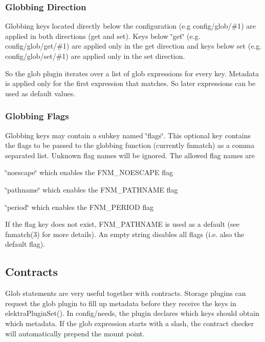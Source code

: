 \subsubsection*{Globbing Direction}

Globbing keys located directly below the configuration (e.\+g {\ttfamily config/glob/\#1}) are applied in both directions (get and set). Keys below \char`\"{}get\char`\"{} (e.\+g. {\ttfamily config/glob/get/\#1}) are applied only in the get direction and keys below set (e.\+g. {\ttfamily config/glob/set/\#1}) are applied only in the set direction.

So the glob plugin iterates over a list of glob expressions for every key. Metadata is applied only for the first expression that matches. So later expressions can be used as default values.

\subsubsection*{Globbing Flags}

Globbing keys may contain a subkey named \char`\"{}flags\char`\"{}. This optional key contains the flags to be passed to the globbing function (currently fnmatch) as a comma separated list. Unknown flag names will be ignored. The allowed flag names are


\begin{DoxyItemize}
\item \char`\"{}noescape\char`\"{} which enables the F\+N\+M\+\_\+\+N\+O\+E\+S\+C\+A\+PE flag
\item \char`\"{}pathname\char`\"{} which enables the F\+N\+M\+\_\+\+P\+A\+T\+H\+N\+A\+ME flag
\item \char`\"{}period\char`\"{} which enables the F\+N\+M\+\_\+\+P\+E\+R\+I\+OD flag
\end{DoxyItemize}

If the flag key does not exist, F\+N\+M\+\_\+\+P\+A\+T\+H\+N\+A\+ME is used as a default (see fnmatch(3) for more details). An empty string disables all flags (i.\+e. also the default flag). \subsection*{Contracts}

Glob statements are very useful together with contracts. Storage plugins can request the glob plugin to fill up metadata before they receive the keys in {\ttfamily elektra\+Plugin\+Set()}. In {\ttfamily config/needs}, the plugin declares which keys should obtain which metadata. If the glob expression starts with a slash, the contract checker will automatically prepend the mount point.

